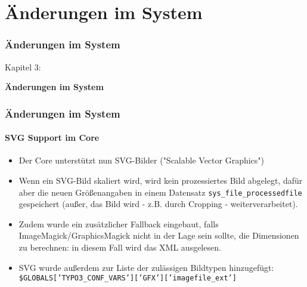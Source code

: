 %

\section{Änderungen im System}
\begin{frame}[fragile]
	\frametitle{Änderungen im System}

	\begin{center}\huge{Kapitel 3:}\end{center}
	\begin{center}\huge{\color{typo3darkgrey}\textbf{Änderungen im System}}\end{center}

\end{frame}

\begin{frame}[fragile]
	\frametitle{Änderungen im System}
	\framesubtitle{SVG Support im Core}

	\begin{itemize}
		\item Der Core unterstützt nun SVG-Bilder ("Scalable Vector Graphics")

		\item Wenn ein SVG-Bild skaliert wird, wird kein prozessiertes Bild abgelegt,
			dafür aber die neuen Größenangaben in einem Datensatz \texttt{sys\_file\_processedfile}
			gespeichert\newline
			\small(außer, das Bild wird - z.B. durch Cropping - weiterverarbeitet)\normalsize.

		\item Zudem wurde ein zusätzlicher Fallback eingebaut, falls ImageMagick/GraphicsMagick nicht
			in der Lage sein sollte, die Dimensionen zu berechnen: in diesem Fall wird das XML ausgelesen.

		\item SVG wurde außerdem zur Liste der zulässigen Bildtypen hinzugefügt:\newline
			\texttt{\$GLOBALS['TYPO3\_CONF\_VARS']['GFX']['imagefile\_ext']}

	\end{itemize}

\end{frame}

